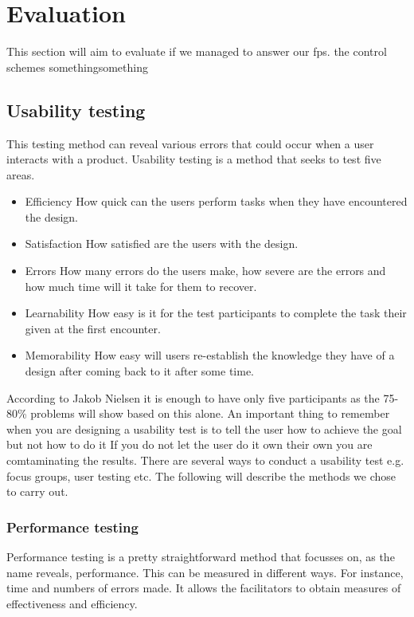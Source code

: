 \section{Evaluation}
This section will aim to evaluate if we managed to answer our fps. the control schemes somethingsomething

\subsection{Usability testing}

This testing method can reveal various errors that could occur when a user interacts with a product.
Usability testing is a method that seeks to test five areas. \cite{usability}

\begin{itemize}
\item Efficiency
How quick can the users perform tasks when they have encountered the design. \cite{usability}
\item Satisfaction
How satisfied are the users with the design. \cite{usability}
\item Errors
How many errors do the users make, how severe are the errors and how much time will it take for them to recover. \cite{usability}
\item Learnability
How easy is it for the test participants to complete the task their given at the first encounter. \cite{usability}
\item Memorability
How easy will users re-establish the knowledge they have of a design after coming back to it after some time. \cite{usability}
\end{itemize}

According to Jakob Nielsen it is enough to have only five participants as the 75-80\% problems will show based on this alone. \cite{usability}
An important thing to remember when you are designing a usability test is to tell the user how to achieve the goal but not how to do it \cite{usability} If you do not let the user do it own their own you are comtaminating the results. \cite{usability}
There are several ways to conduct a usability test e.g. focus groups, user testing etc.
The following will describe the methods we chose to carry out.

\subsubsection{Performance testing}

Performance testing is a pretty straightforward method that focusses on, as the name reveals, performance. This can be measured in different ways. For instance, time and numbers of errors made.
It allows the facilitators to obtain measures of effectiveness and efficiency. \cite{performance}

